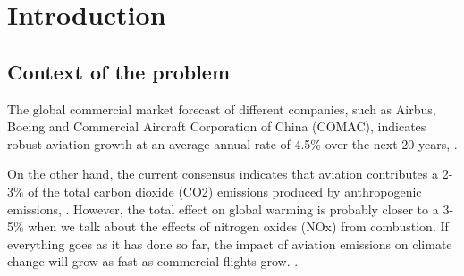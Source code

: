 

\chapter{Introduction}


\section{Context of the problem}
%
%
The global commercial market forecast of different companies, such as Airbus, Boeing and Commercial Aircraft Corporation of China (COMAC), indicates robust aviation growth at an average annual rate of 4.5$\%$  over the next 20 years, \cite{CHEN2019}.

On the other hand, the current consensus indicates that aviation contributes a 2-3$\%$ of the total carbon dioxide (CO2) emissions produced by anthropogenic emissions, \cite{CHEN2019}. However, the total effect on global warming is probably closer to a 3-5$\%$ when we talk about the effects of nitrogen oxides (NOx) from combustion. If everything goes as it has done so far, the impact of aviation emissions on climate change will grow as fast as commercial flights grow. \cite{CHEN2019}.

